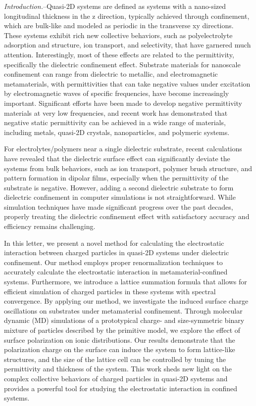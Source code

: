 \documentclass[aps,prl,reprint,showpacs,floatfix,superscriptaddress]{revtex4-2}
\begin{document}
\textit{Introduction.}--Quasi-2D systems are defined as systems with a nano-sized longitudinal thickness in the z direction, typically achieved through confinement, which are bulk-like and modeled as periodic in the transverse xy directions. 
These systems exhibit rich new collective behaviors, such as polyelectrolyte adsorption and structure, ion transport, and selectivity, that have garnered much attention. Interestingly, most of these effects are related to the permittivity, specifically the dielectric confinement effect. 
Substrate materials for nanoscale confinement can range from dielectric to metallic, and electromagnetic metamaterials, with permittivities that can take negative values under excitation by electromagnetic waves of specific frequencies, have become increasingly important. 
Significant efforts have been made to develop negative permittivity materials at very low frequencies, and recent work has demonstrated that negative static permittivity can be achieved in a wide range of materials, including metals, quasi-2D crystals, nanoparticles, and polymeric systems.

For electrolytes/polymers near a single dielectric substrate, recent calculations have revealed that the dielectric surface effect can significantly deviate the systems from bulk behaviors, such as ion transport, polymer brush structure, and pattern formation in dipolar films, especially when the permittivity of the substrate is negative.
However, adding a second dielectric substrate to form dielectric confinement in computer simulations is not straightforward. 
While simulation techniques have made significant progress over the past decades, properly treating the dielectric confinement effect with satisfactory accuracy and efficiency remains challenging.

In this letter, we present a novel method for calculating the electrostatic interaction between charged particles in quasi-2D systems under dielectric confinement. 
Our method employs proper renormalization techniques to accurately calculate the electrostatic interaction in metamaterial-confined systems. 
Furthermore, we introduce a lattice summation formula that allows for efficient simulation of charged particles in these systems with spectral convergence.
By applying our method, we investigate the induced surface charge oscillations on substrates under metamaterial confinement. 
Through molecular dynamic (MD) simulations of a prototypical charge- and size-symmetric binary mixture of particles described by the primitive model, we explore the effect of surface polarization on ionic distributions. 
Our results demonstrate that the polarization charge on the surface can induce the system to form lattice-like structures, and the size of the lattice cell can be controlled by tuning the permittivity and thickness of the system. 
This work sheds new light on the complex collective behaviors of charged particles in quasi-2D systems and provides a powerful tool for studying the electrostatic interaction in confined systems.
\end{document}
